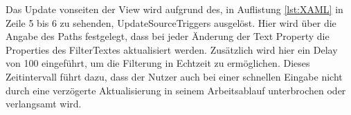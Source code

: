 Das Update vonseiten der View wird aufgrund des, in Auflistung \ref{lst:XAML} in Zeile 5 bis 6 zu sehenden, UpdateSourceTriggers ausgelöst. 
Hier wird über die Angabe des Paths festgelegt, dass bei jeder Änderung der Text Property die Properties des FilterTextes aktualisiert werden.
Zusätzlich wird hier ein Delay von 100 eingeführt, um die Filterung in Echtzeit zu ermöglichen.
Dieses Zeitintervall führt dazu, dass der Nutzer auch bei einer schnellen Eingabe nicht durch eine verzögerte Aktualisierung in seinem Arbeitsablauf unterbrochen  oder verlangsamt wird.




